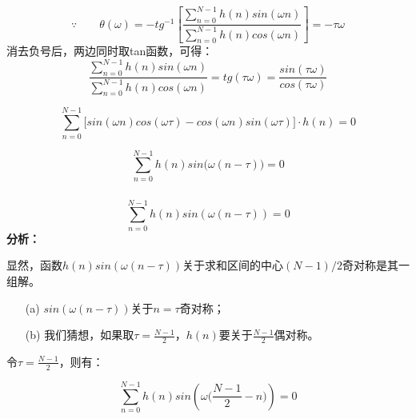 \documentclass[notheorems,compress,mathserif,table]{beamer}
\begin{document}
\begin{frame}[allowframebreaks]\frametitle{}%
        $$\because\quad\quad
        \theta(\omega) = -tg^{-1}\left[\frac{
        \sum_{n=0}^{N-1}h(n)sin(\omega n)}{
        \sum_{n=0}^{N-1}h(n)cos(\omega n)}\right] = -\tau\omega$$
     消去负号后，两边同时取tan函数，可得：
        $$\frac{\sum_{n=0}^{N-1}h(n)sin(\omega n)}{\sum_{n=0}^{N-1}h(n)cos(\omega n)}
        = tg(\tau\omega) = \frac{sin(\tau\omega)}{cos(\tau\omega)}$$

        $$\sum_{n=0}^{N-1}\Big[sin(\omega n)cos(\omega\tau)-cos(\omega n)sin(\omega\tau)\Big]\cdot h(n) =0 $$

        $$\sum_{n=0}^{N-1}h(n)sin\big(\omega(n-\tau)\big)=0$$
\end{frame}



\begin{frame}[allowframebreaks]\frametitle{}%
  $$\sum_{n=0}^{N-1}h(n)sin(\omega(n-\tau))=0$$
\textbf{分析：}

显然，函数$h(n)sin(\omega(n-\tau))$关于求和区间的中心$(N-1)/2$奇对称是其一组解。
\begin{enumerate}
  \item [(a)] $sin(\omega(n-\tau))$关于$n=\tau$奇对称；
  \item [(b)] 我们猜想，如果取$\tau =\frac{N-1}{2}$，$h(n)$要关于$\frac{N-1}{2}$偶对称。
\end{enumerate}
令$\tau = \frac{N-1}{2}$，则有：

$$\sum_{n=0}^{N-1}h(n)sin\left(\omega\Big(\frac{N-1}{2}-n\Big)\right)=0$$
\end{frame}
\end{document}
